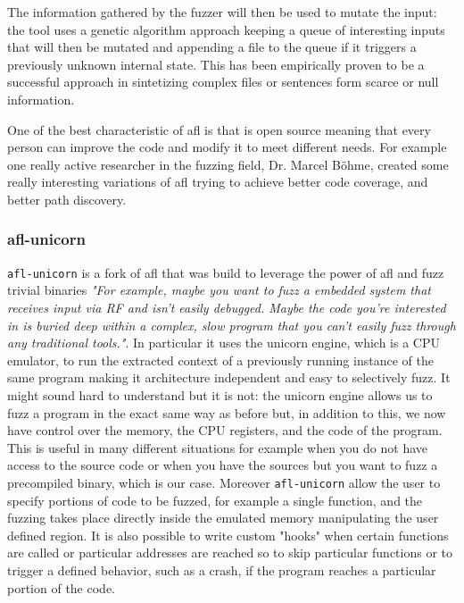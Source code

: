 \documentclass[../main.tex]{subfiles}
\begin{document}
The information gathered by the fuzzer will then be used to mutate the input:
the tool uses a genetic algorithm approach keeping a queue of interesting inputs
that will then be mutated and appending a file to the queue if it triggers a
previously unknown internal state. This has been empirically proven to be a
successful approach in sintetizing complex files or sentences form scarce or
null information\cite{aflblog}.

One of the best characteristic of afl is that is open source meaning that every
person can improve the code and modify it to meet different needs. For example
one really active researcher in the fuzzing field, Dr. Marcel
B\"ohme\cite{mbhome}, created some really interesting variations of afl trying
to achieve better code coverage\cite{aflfast}\cite{greybf}, and better path
discovery\cite{pythia}.

\subsubsection{afl-unicorn}
\label{sub:afl-unicorn}

\texttt{afl-unicorn} is a fork of afl that was build to leverage the power of
afl and fuzz trivial binaries \textit{"For example, maybe you want to fuzz a
embedded system that receives input via RF and isn’t easily debugged. Maybe the
code you’re interested in is buried deep within a complex, slow program that you
can’t easily fuzz through any traditional tools."}\cite{aflunicorn}. In
particular it uses the unicorn engine\cite{unicorn}, which is a CPU emulator, to
run the extracted context of a previously running instance of the same program
making it architecture independent and easy to selectively fuzz. It might sound
hard to understand but it is not: the unicorn engine allows us to fuzz a program
in the exact same way as before but, in addition to this, we now have control
over the memory, the CPU registers, and the code of the program. This is useful
in many different situations for example when you do not have access to the
source code or when you have the sources but you want to fuzz a precompiled
binary, which is our case. Moreover \texttt{afl-unicorn} allow the user to
specify portions of code to be fuzzed, for example a single function, and the
fuzzing takes place directly inside the emulated memory manipulating the user
defined region. It is also possible to write custom "hooks" when certain
functions are called or particular addresses are reached so to skip particular
functions or to trigger a defined behavior, such as a crash, if the program
reaches a particular portion of the code.
\end{document}
